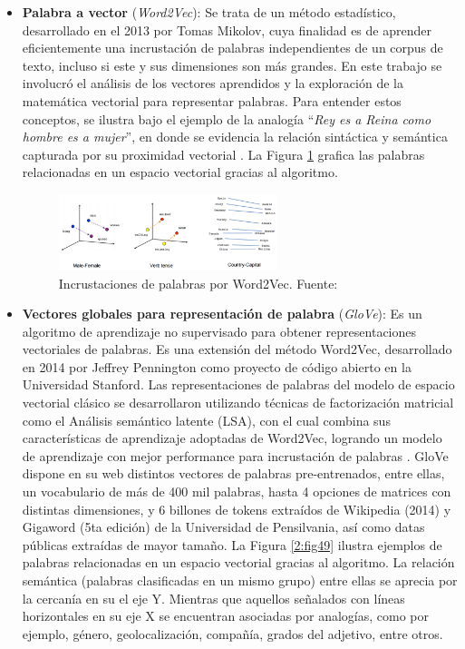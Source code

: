 \begin{itemize}
\begin{itemize}
		\item \textbf{Palabra a vector} (\textit{Word2Vec}): Se trata de un método estadístico, desarrollado en el 2013 por Tomas Mikolov, cuya finalidad es de aprender eficientemente una incrustación de palabras independientes de un corpus de texto, incluso si este y sus dimensiones son más grandes. En este trabajo se involucró el análisis de los vectores aprendidos y la exploración de la matemática vectorial para representar palabras. Para entender estos conceptos, se ilustra bajo el ejemplo de la analogía “\textit{Rey es a Reina como hombre es a mujer}”, en donde se evidencia la relación sintáctica y semántica capturada por su proximidad vectorial \parencite{bk_brownlee2017deeplearning_nlp}. La Figura \ref{2:fig48} grafica las palabras relacionadas en un espacio vectorial gracias al algoritmo.
		
		\begin{figure}[!ht]
			\begin{center}
				\includegraphics[width=0.60\textwidth]{2/figures/word2vec.png}
				\caption[Incrustaciones de palabras por Word2Vec]{Incrustaciones de palabras por Word2Vec. Fuente: \cite{tec_bujokas2020word2vec}}
				\label{2:fig48}
			\end{center}
		\end{figure}
		
		\item \textbf{Vectores globales para representación de palabra} (\textit{GloVe}): Es un algoritmo de aprendizaje no supervisado para obtener representaciones vectoriales de palabras. Es una extensión del método Word2Vec, desarrollado en 2014 por Jeffrey Pennington como proyecto de código abierto en la Universidad Stanford. Las representaciones de palabras del modelo de espacio vectorial clásico se desarrollaron utilizando técnicas de factorización matricial como el Análisis semántico latente (LSA), con el cual combina sus características de aprendizaje adoptadas de Word2Vec, logrando un modelo de aprendizaje con mejor performance para incrustación de palabras \parencite{gl_pennington2014glove}. GloVe dispone en su web distintos vectores de palabras pre-entrenados, entre ellas, un vocabulario de más de 400 mil palabras, hasta 4 opciones de matrices con distintas dimensiones, y 6 billones de tokens extraídos de Wikipedia (2014) y Gigaword (5ta edición) de la Universidad de Pensilvania, así como datas públicas extraídas de mayor tamaño. La Figura \ref{2:fig49} ilustra ejemplos de palabras  relacionadas en un espacio vectorial gracias al algoritmo. La relación semántica (palabras clasificadas en un mismo grupo) entre ellas se aprecia por la cercanía en su el eje Y. Mientras que aquellos señalados con líneas horizontales en su eje X se encuentran asociadas por analogías, como por ejemplo, género, geolocalización, compañía, grados del adjetivo, entre otros.
		

\end{itemize}
\end{itemize}
